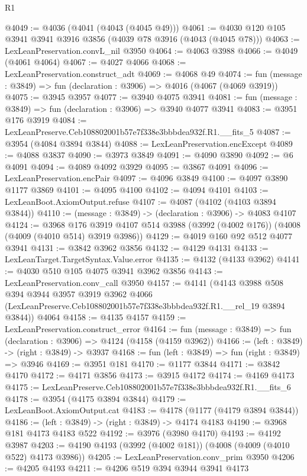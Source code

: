 \begin{lexlean}{R1}
\begin{coremodule}
@4049 := @4036 (@4041 (@4043 (@4045 @49)))
@4061 := @4030 @120 @105 @3941 @3941 @3916 @3856 (@4039 @78 @3916 (@4043 (@4045 @78)))
@4063 := LexLeanPreservation.convL_nil @3950
@4064 := @4063 @3988
@4066 := @4049 (@4061 @4064)
@4067 := @4027 @4066
@4068 := LexLeanPreservation.construct_adt
@4069 := @4068 @49
@4074 := fun (message : @3849) => fun (declaration : @3906) => @4016 (@4067 (@4069 @3919))
@4075 := @3945 @3957
@4077 := @3940 @4075 @3941
@4081 := fun (message : @3849) => fun (declaration : @3906) => @3940 @4077 @3941
@4083 := @3951 @176 @3919
@4084 := LexLeanPreserve.Ceb108802001b57e7f338e3bbbdea932f.R1.__fits_5
@4087 := @3954 (@4084 @3894 @3844)
@4088 := LexLeanPreservation.encExcept
@4089 := @4088 @3837
@4090 := @3973 @3849
@4091 := @4090 @3890
@4092 := @6 @4091
@4094 := @4089 @4092 @3929
@4095 := @3867 @4091
@4096 := LexLeanPreservation.encPair
@4097 := @4096 @3849
@4100 := @4097 @3890 @1177 @3869
@4101 := @4095 @4100
@4102 := @4094 @4101
@4103 := LexLeanBoot.AxiomOutput.refuse
@4107 := @4087 (@4102 (@4103 @3894 @3844))
@4110 := (message : @3849) -> (declaration : @3906) -> @4083 @4107
@4124 := @3968
    @176
    @3919
    @4107
    @514
    @3988
    (@3992 (@4002 @176))
    (@4008 (@4009 (@4010 @514) @3919 @3986))
@4129 := @4019 @160 @92 @512 @4077 @3941
@4131 := @3842 @3962 @3856
@4132 := @4129 @4131
@4133 := LexLeanTarget.TargetSyntax.Value.error
@4135 := @4132 (@4133 @3962)
@4141 := @4030 @510 @105 @4075 @3941 @3962 @3856
@4143 := LexLeanPreservation.conv_call @3950
@4157 := @4141
    (@4143
      @3988
      @508
      @394
      @3944
      @3957
      @3919
      @3962
      @4066
      (LexLeanPreserve.Ceb108802001b57e7f338e3bbbdea932f.R1.__rel_19 @3894 @3844))
    @4064
@4158 := @4135 @4157
@4159 := LexLeanPreservation.construct_error
@4164 := fun (message : @3849) => fun (declaration : @3906) => @4124 (@4158 (@4159 @3962))
@4166 := (left : @3849) -> (right : @3849) -> @3937
@4168 := fun (left : @3849) => fun (right : @3849) => @3946
@4169 := @3951 @181
@4170 := @1177 @3844
@4171 := @3842 @4170
@4172 := @4171 @3856
@4173 := @3915 @4172
@4174 := @4169 @4173
@4175 := LexLeanPreserve.Ceb108802001b57e7f338e3bbbdea932f.R1.__fits_6
@4178 := @3954 (@4175 @3894 @3844)
@4179 := LexLeanBoot.AxiomOutput.cat
@4183 := @4178 (@1177 (@4179 @3894 @3844))
@4186 := (left : @3849) -> (right : @3849) -> @4174 @4183
@4190 := @3968 @181 @4173 @4183 @522
@4192 := @3976 (@3980 @4170)
@4193 := @4192 @3987
@4203 := @4190 @4193 (@3992 (@4002 @181)) (@4008 (@4009 (@4010 @522) @4173 @3986))
@4205 := LexLeanPreservation.conv_prim @3950
@4206 := @4205 @4193
@4211 := @4206 @519 @394 @3944 @3941 @4173

\end{coremodule}
\end{lexlean}
